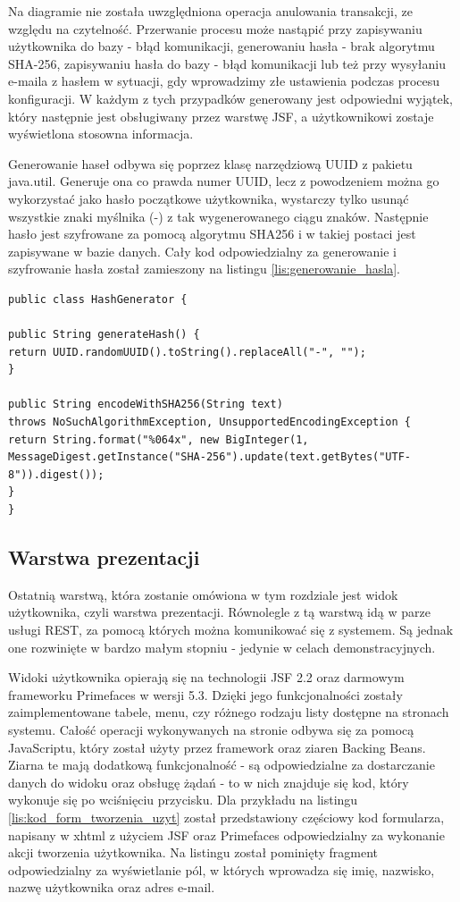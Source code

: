 Na diagramie nie została uwzględniona operacja anulowania transakcji, ze względu na czytelność. Przerwanie procesu może nastąpić przy zapisywaniu użytkownika do bazy - błąd komunikacji, generowaniu hasła - brak algorytmu SHA-256, zapisywaniu hasła do bazy - błąd komunikacji lub też przy wysyłaniu e-maila z hasłem w sytuacji, gdy wprowadzimy złe ustawienia podczas procesu konfiguracji. W każdym z tych przypadków generowany jest odpowiedni wyjątek, który następnie jest obsługiwany przez warstwę JSF, a użytkownikowi zostaje wyświetlona stosowna informacja.

Generowanie haseł odbywa się poprzez klasę narzędziową UUID z pakietu java.util. Generuje ona co prawda numer UUID, lecz z powodzeniem można go wykorzystać jako hasło początkowe użytkownika, wystarczy tylko usunąć wszystkie znaki myślnika (-) z tak wygenerowanego ciągu znaków. Następnie hasło jest szyfrowane za pomocą algorytmu SHA256 i w takiej postaci jest zapisywane w bazie danych. Cały kod odpowiedzialny za generowanie i szyfrowanie hasła został zamieszony na listingu \ref{lis:generowanie_hasla}.

\begin{lstlisting}[caption={Klasa generująca i szyfrująca hasła}, label=lis:generowanie_hasla, numbers=none]
public class HashGenerator {

public String generateHash() {
return UUID.randomUUID().toString().replaceAll("-", "");
}

public String encodeWithSHA256(String text) 
throws NoSuchAlgorithmException, UnsupportedEncodingException {
return String.format("%064x", new BigInteger(1, 
MessageDigest.getInstance("SHA-256").update(text.getBytes("UTF-8")).digest());
}
}\end{lstlisting}

\subsection{Warstwa prezentacji}

Ostatnią warstwą, która zostanie omówiona w tym rozdziale jest widok użytkownika, czyli warstwa prezentacji. Równolegle z tą warstwą idą w parze usługi REST, za pomocą których można komunikować się z systemem. Są jednak one rozwinięte w bardzo małym stopniu - jedynie w celach demonstracyjnych.

Widoki użytkownika opierają się na technologii JSF 2.2 oraz darmowym frameworku Primefaces w wersji 5.3. Dzięki jego funkcjonalności zostały zaimplementowane tabele, menu, czy różnego rodzaju listy dostępne na stronach systemu. Całość operacji wykonywanych na stronie odbywa się za pomocą JavaScriptu, który został użyty przez framework oraz ziaren Backing Beans. Ziarna te mają dodatkową funkcjonalność - są odpowiedzialne za dostarczanie danych do widoku oraz obsługę żądań - to w nich znajduje się kod, który wykonuje się po wciśnięciu przycisku. Dla przykładu na listingu \ref{lis:kod_form_tworzenia_uzyt} został przedstawiony częściowy kod formularza, napisany w xhtml z użyciem JSF oraz Primefaces odpowiedzialny za wykonanie akcji tworzenia użytkownika. Na listingu został pominięty fragment odpowiedzialny za wyświetlanie pól, w których wprowadza się imię, nazwisko, nazwę użytkownika oraz adres e-mail.

